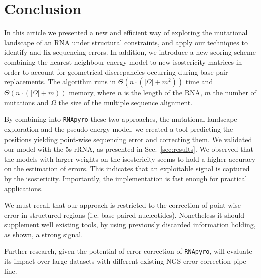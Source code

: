 \section{Conclusion}
\label{sec:conclusion}

In this article we presented a new and efficient way of exploring the mutational landscape of an RNA under structural constraints,
and apply our techniques to identify and fix sequencing errors. In addition, we introduce a new
scoring scheme combining the nearest-neighbour energy model to new isostericity matrices in order to account for geometrical
discrepancies occurring during base pair replacements.
The algorithm runs in  $\Theta(n\cdot(|\Omega|+m^2))$ time and $\Theta(n\cdot(|\Omega|+m))$ memory, where $n$ is the length of the RNA,
$m$ the number of mutations and $\Omega$ the size of the multiple sequence alignment.


By combining  into \texttt{RNApyro} these two approaches,  the 
mutational landscape exploration and the pseudo energy model,
 we created a tool predicting the positions
 yielding point-wise sequencing error and correcting them.
We validated our model with the 5s rRNA,
as presented in Sec.~\ref{sec:results}.
We observed that the models
with larger weights on the
isostericity seems to hold a higher accuracy on the estimation of errors.
This indicates that an exploitable signal is captured by the isostericity.
Importantly, the implementation is fast enough for practical applications. 


We must recall that our approach is restricted to
 the correction of point-wise error in structured regions (i.e. base paired nucleotides).
 Nonetheless it should supplement well existing tools, by using previously discarded
information holding, as shown, a strong signal.

Further research, given the potential of error-correction of \texttt{RNApyro}, 
will evaluate its impact over large datasets with different existing
  NGS error-correction pipe-line.